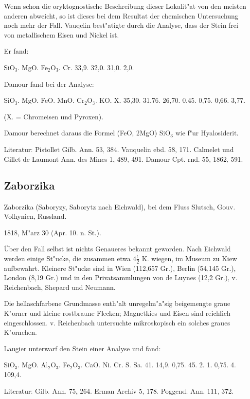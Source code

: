 \documentclass[a4paper, 11pt, oneside]{article}
\begin{document}
Wenn schon die oryktognostische Beschreibung dieser Lokalit"at von den meisten anderen abweicht, so ist dieses bei dem Resultat der chemischen Untersuchung noch mehr der Fall. Vauqelin best"atigte durch die Analyse, dass der Stein frei von metallischem Eisen und Nickel ist.

Er fand:

SiO$_{3}$. MgO. Fe$_{2}$O$_{3}$. Cr.  
33,9. 32,0. 31,0. 2,0.

Damour fand bei der Analyse:

SiO$_{3}$. MgO. FeO. MnO. Cr$_{2}$O$_{3}$. KO. X.  
35,30. 31,76. 26,70. 0,45. 0,75. 0,66. 3,77.

(X. = Chromeisen und Pyroxen).

Damour berechnet daraus die Formel (FeO, 2MgO) SiO$_{3}$ wie f"ur Hyalosiderit.

Literatur: Pistollet Gilb. Ann. 53, 384. Vauquelin ebd. 58, 171. Calmelet und Gillet de Laumont Ann. des Mines 1, 489, 491. Damour Cpt. rnd. 55, 1862, 591.

\subsection{Zaborzika}
\normalsize
\paragraph{}
Zaborzika (Saboryzy, Saborytz nach Eichwald), bei dem Fluss Slutsch, Gouv. Volhynien, Russland.

1818, M"arz 30 (Apr. 10. n. St.).

Über den Fall selbst ist nichts Genaueres bekannt geworden. Nach Eichwald werden einige St"ucke, die zusammen etwa $4\frac{1}{2}$ K. wiegen, im Museum zu Kiew aufbewahrt. Kleinere St"ucke sind in Wien (112,657 Gr.), Berlin (54,145 Gr.), London (8,19 Gr.) und in den Privatsammlungen von de Luynes (12,2 Gr.), v. Reichenbach, Shepard und Neumann.

Die hellaschfarbene Grundmasse enth"alt unregelm"a"sig beigemengte graue K"orner und kleine rostbraune Flecken; Magnetkies und Eisen sind reichlich eingeschlossen. v. Reichenbach untersuchte mikroskopisch ein solches graues K"ornchen.

Laugier unterwarf den Stein einer Analyse und fand:

SiO$_{3}$. MgO. Al$_{2}$O$_{3}$. Fe$_{2}$O$_{3}$. CaO. Ni. Cr. S. Sa.  
41. 14,9. 0,75. 45. 2. 1. 0,75. 4. 109,4.

Literatur: Gilb. Ann. 75, 264. Erman Archiv 5, 178. Poggend. Ann. 111, 372.
\end{document}
